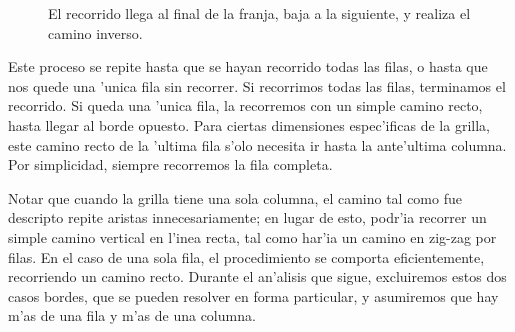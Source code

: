 \begin{figure}[h]
	\begin{center}
		
	\end{center}
	\caption{El recorrido llega al final de la franja, baja a la siguiente, y realiza el camino inverso.}
	\label{fig:aproximados_7}
\end{figure}

Este proceso se repite hasta que se hayan recorrido todas las filas, o hasta que nos quede una 'unica fila sin recorrer. Si recorrimos todas las filas, terminamos el recorrido. Si queda una 'unica fila, la recorremos con un simple camino recto, hasta llegar al borde opuesto. Para ciertas dimensiones espec'ificas de la grilla, este camino recto de la 'ultima fila s'olo necesita ir hasta la ante'ultima columna. Por simplicidad, siempre recorremos la fila completa.

Notar que cuando la grilla tiene una sola columna, el camino tal como fue descripto repite aristas innecesariamente; en lugar de esto, podr'ia recorrer un simple camino vertical en l'inea recta, tal como har'ia un camino en zig-zag por filas. En el caso de una sola fila, el procedimiento se comporta eficientemente, recorriendo un camino recto. Durante el an'alisis que sigue, excluiremos estos dos casos bordes, que se pueden resolver en forma particular, y asumiremos que hay m'as de una fila y m'as de una columna.

